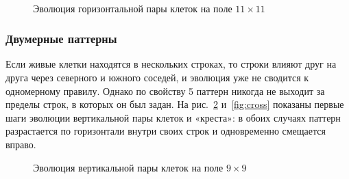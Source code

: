 \documentclass[a4paper,14pt]{extarticle}
\newcommand{\consolesmall}{\fontsize{7}{7.35}\selectfont\ttfamily}
\newcommand{\console}[2][\consolesmall]{}
\begin{document}
\begin{figure}[H]
	\centering
	\begin{minipage}{0.3\textwidth}\centering\console{hpair_0}\end{minipage}
	\begin{minipage}{0.3\textwidth}\centering\console{hpair_1}\end{minipage}
	\begin{minipage}{0.3\textwidth}\centering\console{hpair_2}\end{minipage}\\[3mm]
	\begin{minipage}{0.3\textwidth}\centering\console{hpair_3}\end{minipage}
	\begin{minipage}{0.3\textwidth}\centering\console{hpair_4}\end{minipage}
	\caption{Эволюция горизонтальной пары клеток на поле $11 \times 11$}
	\label{fig:hpair}
\end{figure}

\subsubsection*{Двумерные паттерны}

Если живые клетки находятся в нескольких строках, то строки влияют друг на друга через северного и южного соседей, и эволюция уже не сводится к одномерному правилу. Однако по свойству 5 паттерн никогда не выходит за пределы строк, в которых он был задан. На рис.~\ref{fig:vpair} и~\ref{fig:cross} показаны первые шаги эволюции вертикальной пары клеток и «креста»: в обоих случаях паттерн разрастается по горизонтали внутри своих строк и одновременно смещается вправо.

\begin{figure}[H]
	\centering
	\begin{minipage}{0.23\textwidth}\centering\console{vpair_0}\end{minipage}
	\begin{minipage}{0.23\textwidth}\centering\console{vpair_1}\end{minipage}
	\begin{minipage}{0.23\textwidth}\centering\console{vpair_2}\end{minipage}
	\begin{minipage}{0.23\textwidth}\centering\console{vpair_3}\end{minipage}
	\caption{Эволюция вертикальной пары клеток на поле $9 \times 9$}
	\label{fig:vpair}
\end{figure}
\end{document}
